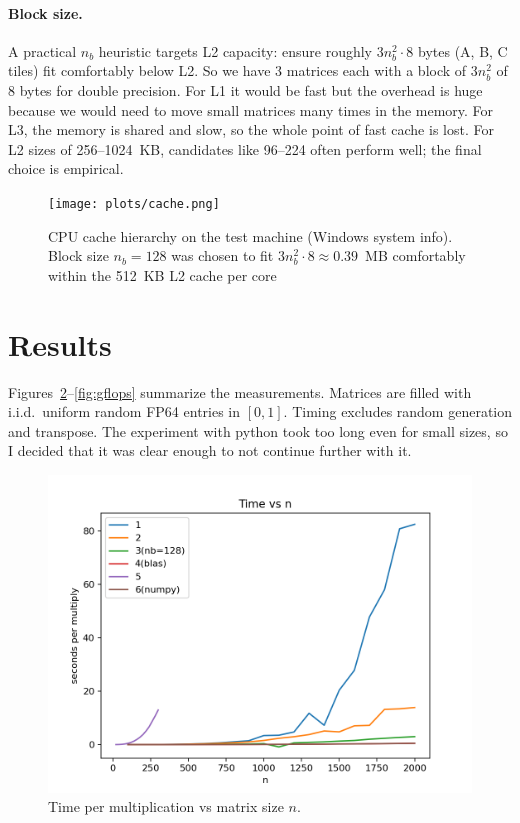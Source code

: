 \documentclass[11pt,a4paper]{article}
\begin{document}
	\paragraph{Block size.}
	A practical $n_b$ heuristic targets L2 capacity: ensure roughly $3n_b^2\cdot 8$ bytes (A, B, C tiles) fit comfortably below L2. So we have 3 matrices each with a block of $3n_b^2$ of 8 bytes for double precision. For L1 it would be fast but the overhead is huge because we would need to move small matrices many times in the memory. For L3, the memory is shared and slow, so the whole point of fast cache is lost. For L2 sizes of 256–1024~KB, candidates like 96–224 often perform well; the final choice is empirical.
		\begin{figure}[H]
		\centering
		\texttt{[image: plots/cache.png]}
		\caption{CPU cache hierarchy on the test machine (Windows system info). 
			Block size $n_b=128$ was chosen to fit $3n_b^2 \cdot 8 \approx 0.39$~MB 
			comfortably within the 512~KB L2 cache per core}
		\label{fig:cache}
	\end{figure}
	

	
	\section{Results}
	Figures~\ref{fig:time}–\ref{fig:gflops} summarize the measurements. Matrices are filled with i.i.d.\ uniform random FP64 entries in $[0,1]$. Timing excludes random generation and transpose. The experiment with python took too long even for small sizes, so I decided that it was clear enough to not continue further with it.
	
	\begin{figure}[H]
		\centering
		\includegraphics[width=0.82\linewidth]{plots/time_vs_n.png}
		\caption{Time per multiplication vs matrix size $n$.}
		\label{fig:time}
	\end{figure}
	
\end{document}
